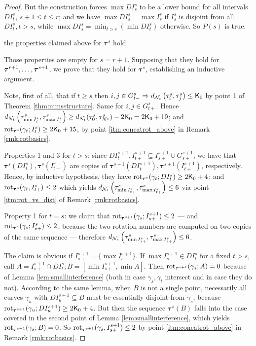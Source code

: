 \begin{proof}
But the construction forces $\max DI^s_s$ to be a lower bound for all intervals $DI^s_t$, $s+1 \leq t \leq r$; and we have $\max DI^s_s=\max I^s_s$ if $I^s_s$ is disjoint from all $DI^s_t,t>s$, while $\max DI^s_s=\min_{t>s}\left(\min DI^s_t\right)$ otherwise. So $P(s)$ is true.

 the properties claimed above for $\bm\tau^s$ hold.

Those properties are empty for $s=r+1$. Supposing that they hold for $\bm\tau^{r+1},\ldots,\linebreak \bm\tau^{s+1}$, we prove that they hold for $\bm\tau^s$, establishing an inductive argument.

Note, first of all, that if $t\geq s$ then $i,j\in G^s_{t-}\Rightarrow d_{{\mathcal N}_t}\left(\tau^s_i,\tau^s_j\right)\leq \mathsf{K}_0$ by point 1 of Theorem \ref{thm:mmsstructure}. Same for $i,j\in G^s_{t+}$. Hence $d_{{\mathcal N}_t}\left(\tau^s_{\min I^s_t},\tau^s_{\max I^s_t}\right)\geq d_{{\mathcal N}_t}(\tau^s_0,\tau^s_{N^s})-2\mathsf{K}_0=2\mathsf{K}_0+19$; and $\mathrm{rot}_{\bm\tau^s}(\gamma_t;I^s_t)\geq 2\mathsf{K}_0+15$, by point \ref{itm:concatrot_above} in Remark \ref{rmk:rotbasics}.

Properties 1 and 3 for $t>s$: since $DI^{s+1}_t, I^{s+1}_{t+}\subseteq I^{s+1}_{s+}\cup G^{s+1}_{s+}$, we have that $\bm\tau^s(DI^s_t),\bm\tau^s(I^s_{t+})$ are copies of $\bm\tau^{s+1}(DI^{s+1}_t),\bm\tau^{s+1}(I^{s+1}_{t+})$, respectively. Hence, by inductive hypothesis, they have $\mathrm{rot}_{\bm\tau^s}(\gamma_t; DI^s_t)\geq 2\mathsf{K}_0+ 4$; and $\mathrm{rot}_{\bm\tau^s}(\gamma_t,I^s_{t+})\leq 2$ which yields $d_{{\mathcal N}_t}\left(\tau^s_{\min I^s_{t+}}, \tau^s_{\max I^s_{t+}}\right)\leq 6$ via point \ref{itm:rot_vs_dist} of Remark \ref{rmk:rotbasics}.

Property 1 for $t=s$: we claim that $\mathrm{rot}_{\bm\tau^{s+1}}(\gamma_s;I^{s+1}_{s+})\leq 2$ --- and $\mathrm{rot}_{\bm\tau^s}(\gamma_s;I^s_{s+})\leq 2$, because the two rotation numbers are computed on two copies of the same sequence --- therefore $d_{{\mathcal N}_s}\left(\tau^s_{\min I^s_{s+}}, \tau^s_{\max I^s_{s+}}\right)\leq 6$.

The claim is obvious if $I^{s+1}_{s+}=\{\max I^{s+1}_s\}$. If $\max I^{s+1}_s\in DI^s_t$ for a fixed $t>s$, call $A=I^{s+1}_{s+}\cap DI^s_t; B=[\min I^{s+1}_{s+},\min A]$. Then $\mathrm{rot}_{\bm\tau^{s+1}}(\gamma_s;A)=0$ because of Lemma \ref{lem:smallinterference} (both in case $\gamma_s,\gamma_t$ intersect and in case they do not). According to the same lemma, when $B$ is not a single point, necessarily all curves $\gamma_u$ with $DI^{s+1}_u\subseteq B$ must be essentially disjoint from $\gamma_s$, because $\mathrm{rot}_{\bm\tau^{s+1}}(\gamma_u;DI^{s+1}_u)\geq 2\mathsf{K}_0+ 4$. But then the sequence $\bm\tau^s(B)$ falls into the case covered in the second point of Lemma \ref{lem:smallinterference}, which yields $\mathrm{rot}_{\bm\tau^{s+1}}(\gamma_s;B)=0$. So $\mathrm{rot}_{\bm\tau^{s+1}}(\gamma_s,I^{s+1}_{s+})\leq 2$ by point \ref{itm:concatrot_above} in Remark \ref{rmk:rotbasics}. 


\end{proof}
